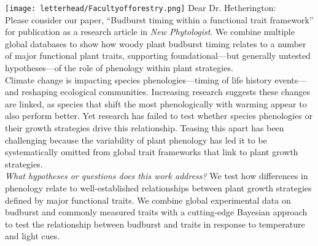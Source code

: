 \documentclass[11pt,a4paper]{article}
\begin{document}
\noindent \texttt{[image: letterhead/Facultyofforestry.png]}
\noindent Dear Dr. Hetherington:
\vspace{1.5ex}\\
\noindent Please consider our paper, ``Budburst timing within a functional trait framework'' for publication as a research article in \emph{New Phytologist}. We combine multiple global databases to show how woody plant budburst timing relates to a number of major functional plant traits, supporting foundational---but generally untested hypotheses---of the role of phenology within plant strategies. %
\vspace{1.5ex}\\ 
\noindent Climate change is impacting species phenologies---timing of life history events---and reshaping ecological communities. Increasing research suggests these changes are linked, as species that shift the most phenologically with warming appear to also perform better. Yet research has failed to test whether species phenologies or their growth strategies drive this relationship. Teasing this apart has been challenging because the variability of plant phenology has led it to be systematically omitted from global trait frameworks that link to plant growth strategies. %
\vspace{1.5ex}\\
\emph{What hypotheses or questions does this work address?} We test how differences in phenology relate to well-established relationships between plant growth strategies defined by major functional traits. We combine global experimental data on budburst and commonly measured traits with a cutting-edge Bayesian approach to test the relationship between budburst and traits in response to temperature and light cues.  %
\vspace{1.5ex}\\
\end{document}
